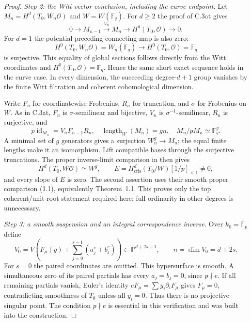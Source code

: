 \begin{proof}
\emph{Step 2: the Witt-vector conclusion, including the curve endpoint.}
Let $M_n=H^d(T_0,W_n\mathcal O)$ and $W=W(\mathbb F_q)$.
For $d\ge2$ the proof of C.3at gives
\[
 0\longrightarrow M_{n-1}\xrightarrow{V_n}M_n
                  \longrightarrow H^d(T_0,\mathcal O)\longrightarrow0.
\]
For $d=1$ the potential preceding connecting map is also zero:
\[
 H^0(T_0,W_n\mathcal O)=W_n(\mathbb F_q)
       \longrightarrow H^0(T_0,\mathcal O)=\mathbb F_q
\]
is surjective. This equality of global sections follows directly from
the Witt coordinates and $H^0(T_0,\mathcal O)=\mathbb F_q$.
Hence the same short exact sequence holds in the curve case.
In every dimension, the succeeding degree-$d+1$ group vanishes by
the finite Witt filtration and coherent cohomological dimension.

Write $F_n$ for coordinatewise Frobenius, $R_n$ for truncation,
and $\sigma$ for Frobenius on $W$. As in C.3at, $F_n$ is
$\sigma$-semilinear and bijective, $V_n$ is
$\sigma^{-1}$-semilinear, $R_n$ is surjective, and
\[
 p\operatorname{id}_{M_n}=V_nF_{n-1}R_n,
 \quad\operatorname{length}_W(M_n)=gn,
 \quad M_n/pM_n\simeq\mathbb F_q^g.
\]
A minimal set of $g$ generators gives a surjection $W_n^g\to M_n$;
the equal finite lengths make it an isomorphism. Lift compatible bases
through the surjective truncations. The proper inverse-limit comparison
in \citet[Section~2, author pp.~6--7]{D_BerthelotBlochEsnault2007}
then gives
\[
 H^d(T_0,W\mathcal O)\simeq W^g,
 \qquad
 E=H^d_{\mathrm{cris}}(T_0/W)[1/p]_{<1}\ne0,
\]
and every slope of $E$ is zero. The second assertion uses their
smooth proper comparison (1.1), equivalently Theorem~1.1. This proves
only the top coherent/unit-root statement required here; full ordinarity
in other degrees is unnecessary.

\emph{Step 3: a smooth suspension and an integral correspondence inverse.}
Over $k_0=\overline{\mathbb F}_p$ define
\[
 V_0=V\left(F_\mu(y)+\sum_{j=0}^{s-1}(a_j^e+b_j^e)\right)
                 \subset\mathbb P^{d+2s+1},
 \qquad n=\dim V_0=d+2s.
\]
For $s=0$ the paired coordinates are omitted. This hypersurface is
smooth. A simultaneous zero of its paired partials has every
$a_j=b_j=0$, since $p\nmid e$. If all remaining partials vanish,
Euler's identity $eF_\mu=\sum y_i\partial_iF_\mu$ gives
$F_\mu=0$, contradicting smoothness of $T_0$ unless all $y_i=0$.
Thus there is no projective singular point. The condition $p\nmid e$
is essential in this verification and was built into the construction.


\end{proof}
